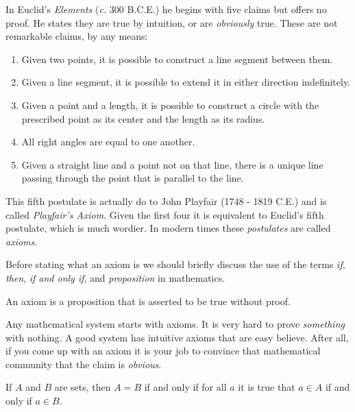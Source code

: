         In Euclid's \textit{Elements} (\textit{c.} 300 B.C.E.) he begins with
        five claims but offers no proof. He states they are true by intuition,
        or are \textit{obviously} true. These are not remarkable claims, by
        any means:
        \begin{enumerate}
            \item Given two points, it is possible to construct a line segment
                between them.
            \item Given a line segment, it is possible to extend it in either
                direction indefinitely.
            \item Given a point and a length, it is possible to construct a
                circle with the prescribed point as its center and the length
                as its radius.
            \item All right angles are equal to one another.
            \item Given a straight line and a point not on that line, there is
                a unique line passing through the point that is parallel to the
                line.
        \end{enumerate}
        This fifth postulate is actually do to John Playfair (1748 - 1819 C.E.)
        and is called \textit{Playfair's Axiom}. Given the first four it is
        equivalent to Euclid's fifth postulate, which is much wordier. In modern
        times these \textit{postulates} are called \textit{axioms}.
        \par\hfill\par
        Before stating what an axiom is we should briefly discuss the use of the
        terms \textit{if}, \textit{then}, \textit{if and only if}, and
        \textit{proposition} in mathematics.
        \begin{definition}
            An axiom is a proposition that is asserted to be true without proof.
        \end{definition}
        Any mathematical system starts with axioms. It is very hard to prove
        \textit{something} with nothing. A good system has intuitive axioms that
        are easy believe. After all, if you come up with an axiom it is your
        job to convince that mathematical community that the claim is
        \textit{obvious}.
        \par\hfill\par
        \begin{axiom}
            If $A$ and $B$ are sets, then $A=B$ if and only if for all
            $a$ it is true that $a\in{A}$ if and only if $a\in{B}$.
        \end{axiom}
